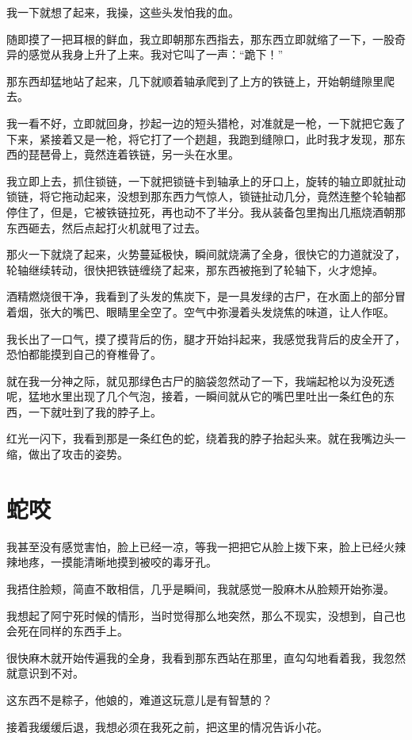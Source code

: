 我一下就想了起来，我操，这些头发怕我的血。

随即摸了一把耳根的鲜血，我立即朝那东西指去，那东西立即就缩了一下，一股奇异的感觉从我身上升了上来。我对它叫了一声：“跪下！”

那东西却猛地站了起来，几下就顺着轴承爬到了上方的铁链上，开始朝缝隙里爬去。

我一看不好，立即就回身，抄起一边的短头猎枪，对准就是一枪，一下就把它轰了下来，紧接着又是一枪，将它打了一个趔趄，我跑到缝隙口，此时我才发现，那东西的琵琶骨上，竟然连着铁链，另一头在水里。

我立即上去，抓住锁链，一下就把锁链卡到轴承上的牙口上，旋转的轴立即就扯动锁链，将它拖动起来，没想到那东西力气惊人，锁链扯动几分，竟然连整个轮轴都停住了，但是，它被铁链拉死，再也动不了半分。我从装备包里掏出几瓶烧酒朝那东西砸去，然后点起打火机就甩了过去。

那火一下就烧了起来，火势蔓延极快，瞬间就烧满了全身，很快它的力道就没了，轮轴继续转动，很快把铁链缠绕了起来，那东西被拖到了轮轴下，火才熄掉。

酒精燃烧很干净，我看到了头发的焦炭下，是一具发绿的古尸，在水面上的部分冒着烟，张大的嘴巴、眼睛里全空了。空气中弥漫着头发烧焦的味道，让人作呕。

我长出了一口气，摸了摸背后的伤，腿才开始抖起来，我感觉我背后的皮全开了，恐怕都能摸到自己的脊椎骨了。

就在我一分神之际，就见那绿色古尸的脑袋忽然动了一下，我端起枪以为没死透呢，猛地水里出现了几个气泡，接着，一瞬间就从它的嘴巴里吐出一条红色的东西，一下就吐到了我的脖子上。

红光一闪下，我看到那是一条红色的蛇，绕着我的脖子抬起头来。就在我嘴边头一缩，做出了攻击的姿势。

\chapter{蛇咬}

我甚至没有感觉害怕，脸上已经一凉，等我一把把它从脸上拨下来，脸上已经火辣辣地疼，一摸能清晰地摸到被咬的毒牙孔。

我捂住脸颊，简直不敢相信，几乎是瞬间，我就感觉一股麻木从脸颊开始弥漫。

我想起了阿宁死时候的情形，当时觉得那么地突然，那么不现实，没想到，自己也会死在同样的东西手上。

很快麻木就开始传遍我的全身，我看到那东西站在那里，直勾勾地看着我，我忽然就意识到不对。

这东西不是粽子，他娘的，难道这玩意儿是有智慧的？

接着我缓缓后退，我想必须在我死之前，把这里的情况告诉小花。

